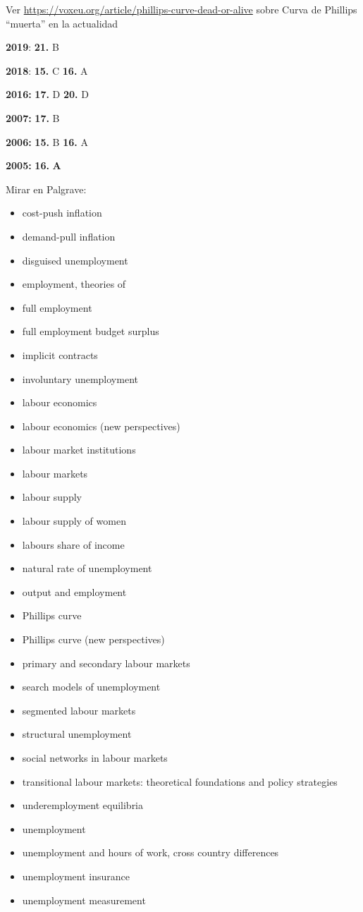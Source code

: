 \documentclass{nuevotema}
\begin{document}
\notas


Ver \url{https://voxeu.org/article/phillips-curve-dead-or-alive} sobre Curva de Phillips ``muerta'' en la actualidad

\textbf{2019}: \textbf{21.} B

\textbf{2018}: \textbf{15.} C \textbf{16.} A

\textbf{2016:} \textbf{17.} D \textbf{20.} D

\textbf{2007:} \textbf{17.} B

\textbf{2006:} \textbf{15.} B \textbf{16.} A

\textbf{2005:} \textbf{16.} \textbf{A}

\bibliografia

Mirar en Palgrave:

\begin{itemize}
	\item cost-push inflation
	\item demand-pull inflation
	\item disguised unemployment
	\item employment, theories of
	\item full employment
	\item full employment budget surplus
	\item implicit contracts
	\item involuntary unemployment
	\item labour economics
	\item labour economics (new perspectives)
	\item labour market institutions
	\item labour markets
	\item labour supply
	\item labour supply of women
	\item labours share of income
	\item natural rate of unemployment
	\item output and employment
	\item Phillips curve
	\item Phillips curve (new perspectives)
	\item primary and secondary labour markets
	\item search models of unemployment
	\item segmented labour markets
	\item structural unemployment
	\item social networks in labour markets
	\item transitional labour markets: theoretical foundations and policy strategies
	\item underemployment equilibria
	\item unemployment
	\item unemployment and hours of work, cross country differences
	\item unemployment insurance
	\item unemployment measurement
\end{itemize}
\end{document}

